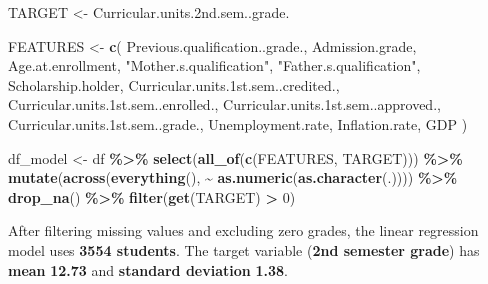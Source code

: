 \documentclass[
]{article}
\newenvironment{Shaded}{\begin{snugshade}}{\end{snugshade}}
\newcommand{\DecValTok}[1]{\textcolor[rgb]{0.00,0.00,0.81}{#1}}
\newcommand{\FunctionTok}[1]{\textcolor[rgb]{0.13,0.29,0.53}{\textbf{#1}}}
\newcommand{\NormalTok}[1]{#1}
\newcommand{\OtherTok}[1]{\textcolor[rgb]{0.56,0.35,0.01}{#1}}
\newcommand{\SpecialCharTok}[1]{\textcolor[rgb]{0.81,0.36,0.00}{\textbf{#1}}}
\newcommand{\StringTok}[1]{\textcolor[rgb]{0.31,0.60,0.02}{#1}}
\begin{document}
\begin{Shaded}
\begin{Highlighting}[]
\NormalTok{TARGET }\OtherTok{\textless{}{-}} \StringTok{\textquotesingle{}Curricular.units.2nd.sem..grade.\textquotesingle{}}

\NormalTok{FEATURES }\OtherTok{\textless{}{-}} \FunctionTok{c}\NormalTok{(}
    \StringTok{\textquotesingle{}Previous.qualification..grade.\textquotesingle{}}\NormalTok{,}
    \StringTok{\textquotesingle{}Admission.grade\textquotesingle{}}\NormalTok{,}
    \StringTok{\textquotesingle{}Age.at.enrollment\textquotesingle{}}\NormalTok{,}
    \StringTok{"Mother.s.qualification"}\NormalTok{,}
    \StringTok{"Father.s.qualification"}\NormalTok{,}
    \StringTok{\textquotesingle{}Scholarship.holder\textquotesingle{}}\NormalTok{,}
    \StringTok{\textquotesingle{}Curricular.units.1st.sem..credited.\textquotesingle{}}\NormalTok{,}
    \StringTok{\textquotesingle{}Curricular.units.1st.sem..enrolled.\textquotesingle{}}\NormalTok{,}
    \StringTok{\textquotesingle{}Curricular.units.1st.sem..approved.\textquotesingle{}}\NormalTok{,}
    \StringTok{\textquotesingle{}Curricular.units.1st.sem..grade.\textquotesingle{}}\NormalTok{,}
    \StringTok{\textquotesingle{}Unemployment.rate\textquotesingle{}}\NormalTok{,}
    \StringTok{\textquotesingle{}Inflation.rate\textquotesingle{}}\NormalTok{,}
    \StringTok{\textquotesingle{}GDP\textquotesingle{}}
\NormalTok{)}

\NormalTok{df\_model }\OtherTok{\textless{}{-}}\NormalTok{ df }\SpecialCharTok{\%\textgreater{}\%}
    \FunctionTok{select}\NormalTok{(}\FunctionTok{all\_of}\NormalTok{(}\FunctionTok{c}\NormalTok{(FEATURES, TARGET))) }\SpecialCharTok{\%\textgreater{}\%}
    \FunctionTok{mutate}\NormalTok{(}\FunctionTok{across}\NormalTok{(}\FunctionTok{everything}\NormalTok{(), }\SpecialCharTok{\textasciitilde{}} \FunctionTok{as.numeric}\NormalTok{(}\FunctionTok{as.character}\NormalTok{(.)))) }\SpecialCharTok{\%\textgreater{}\%}
    \FunctionTok{drop\_na}\NormalTok{() }\SpecialCharTok{\%\textgreater{}\%}
    \FunctionTok{filter}\NormalTok{(}\FunctionTok{get}\NormalTok{(TARGET) }\SpecialCharTok{\textgreater{}} \DecValTok{0}\NormalTok{)}
\end{Highlighting}
\end{Shaded}

After filtering missing values and excluding zero grades, the linear
regression model uses \textbf{3554 students}. The target variable
(\textbf{2nd semester grade}) has \textbf{mean} \textbf{12.73} and
\textbf{standard deviation} \textbf{1.38}.
\end{document}
